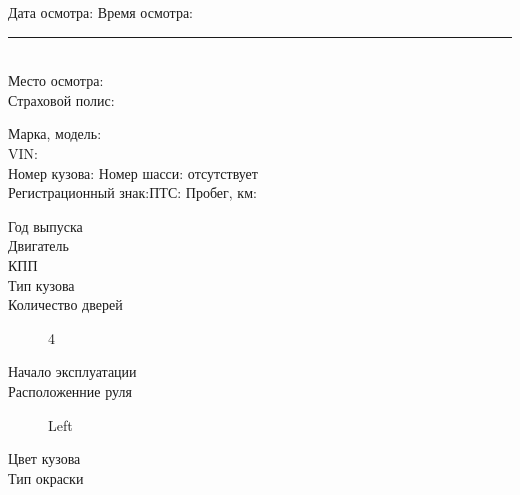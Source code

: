 \documentclass[a4paper,10pt]{report}
\begin{document}
\vspace{2mm}
\noindent Дата осмотра: \osm \hfill Время осмотра:\rule{30mm}{0.1mm}  \\
\noindent Место осмотра:\\
\noindent Страховой полис: \polis\\
\vspace{-2mm}
\begin{tcolorbox}[title=\textsl{Сведения о транспортном средстве},leftrule=0pt,rightrule=0pt,toprule=0pt,titlerule=0pt,sharp corners,
	colback=white,colframe=white,coltitle=black,colbacktitle=YellowOrange]
\end{tcolorbox}
\vspace{-5mm}
\noindent Марка, модель: \\
\noindent VIN:{\vin} \\  
\noindent Номер кузова:{\vin} \hfill Номер шасси: отсутствует\\  
Регистрационный знак:\grz \hfill ПТС:  \hfill Пробег, км:\\
\noindent\parbox[l][5mm]{70mm}
{\begin{description}
			\item[Год выпуска] \hfill {}
			\item[Двигатель] \hfill {}
			\item[КПП] \hfill {}
			\item[Тип кузова] \hfill  {}
			\item[Количество дверей] \hfill 4 
		\end{description}
	}   %
\hfill
\parbox[l][5mm]{70mm}{  
		\begin{description}
			\item[Начало эксплуатации] \hfill {}
			\item[Расположенние руля] \hfill Left
			\item[Цвет кузова] \hfill  {}
			\item[Тип окраски] \hfill {}
					\end{description}
}\\
\end{document}
